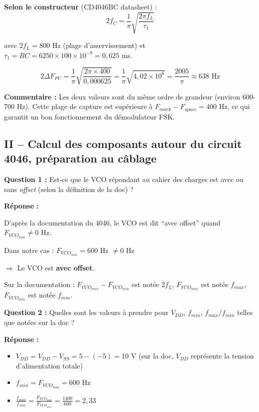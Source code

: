 \documentclass[a4paper,11pt]{article}
\begin{document}
\textbf{Selon le constructeur} (CD4046BC datasheet) :
\[
2f_C = \frac{1}{\pi}\sqrt{\frac{2\pi f_L}{\tau_1}}
\]

avec $2f_L = 800$ Hz (plage d'asservissement) et $\tau_1 = RC = 6250 \times 100 \times 10^{-9} = 0{,}625$ ms.

\[
2\Delta F_{PC} = \frac{1}{\pi}\sqrt{\frac{2\pi \times 400}{0{,}000625}} = \frac{1}{\pi}\sqrt{4{,}02 \times 10^6} = \frac{2005}{\pi} \approx \boxed{638 \text{ Hz}}
\]

\textbf{Commentaire :} Les deux valeurs sont du même ordre de grandeur (environ 600-700 Hz). Cette plage de capture est supérieure à $F_{mark} - F_{space} = 400$ Hz, ce qui garantit un bon fonctionnement du démodulateur FSK.

\newpage
\subsection*{II -- Calcul des composants autour du circuit 4046, préparation au câblage}

\textbf{Question 1 :} Est-ce que le VCO répondant au cahier des charges est avec ou sans \textit{offset} (selon la définition de la doc) ?

\vspace{0.3cm}
\textbf{Réponse :}

D'après la documentation du 4046, le VCO est dit ``avec offset'' quand $F_{VCO_{min}} \neq 0$ Hz.

Dans notre cas : $F_{VCO_{min}} = 600$ Hz $\neq 0$ Hz

$\Rightarrow$ Le VCO est \textbf{avec offset}.

Sur la documentation : $F_{VCO_{max}} - F_{VCO_{min}}$ est notée $2f_L$, $F_{VCO_{max}}$ est notée $f_{max}$, $F_{VCO_{min}}$ est notée $f_{min}$.

\vspace{0.5cm}
\textbf{Question 2 :} Quelles sont les valeurs à prendre pour $V_{DD}$, $f_{min}$, $f_{max}/f_{min}$ telles que notées sur la doc ?

\vspace{0.3cm}
\textbf{Réponse :}

\begin{itemize}
    \item $V_{DD} = V_{DD} - V_{SS} = 5 - (-5) = \boxed{10 \text{ V}}$ (sur la doc, $V_{DD}$ représente la tension d'alimentation totale)
    \item $f_{min} = F_{VCO_{min}} = \boxed{600 \text{ Hz}}$
    \item $\frac{f_{max}}{f_{min}} = \frac{F_{VCO_{max}}}{F_{VCO_{min}}} = \frac{1400}{600} = \boxed{2{,}33}$
\end{itemize}
\end{document}
